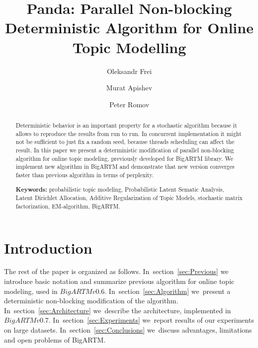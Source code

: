 \documentclass[russian,english]{llncs}
\begin{document}
\title{
    Panda: Parallel Non-blocking Deterministic Algorithm for Online Topic Modelling
}
\author{
    Oleksandr Frei
    \and
    Murat Apishev
    \and
    Peter Romov
}

\maketitle

\begin{abstract}
Deterministic behavior is an important property for a stochastic algorithm
because it allows to reproduce the results from run to run.
In concurrent implementation it might not be sufficient to
just fix a random seed, because threads scheduling can affect the result.
In this paper we present a deterministic modification of parallel non-blocking algorithm
for online topic modeling, previously developed for BigARTM library.
We implement new algorithm in BigARTM and demonstrate that new version converges faster
than previous algorithm in terms of perplexity.

\vspace{1em}
\textbf{Keywords:}
    probabilistic topic modeling,
    Probabilistic Latent Sematic Analysis,
    Latent Dirichlet Allocation,
    Additive Regularization of Topic Models,
    stochastic matrix factorization,
    EM-algorithm,
    BigARTM.
\end{abstract}

\section{Introduction}

The rest of the paper is organized as follows.
In~section~\ref{sec:Previous}
we introduce basic notation and summarize previous algorithm for online topic modeling, used in $BigARTM v0.6$.
In~section~\ref{sec:Algorithm}
we~present a deterministic non-blocking modification of the algorithm.
In~section~\ref{sec:Architecture}
we~describe the architecture, implemented in $BigARTM v0.7$.
In~section~\ref{sec:Experiments}
we~report results of our experiments on large datasets.
In~section~\ref{sec:Conclusions}
we~discuss advantages, limitations and open problems of BigARTM.
\end{document}
